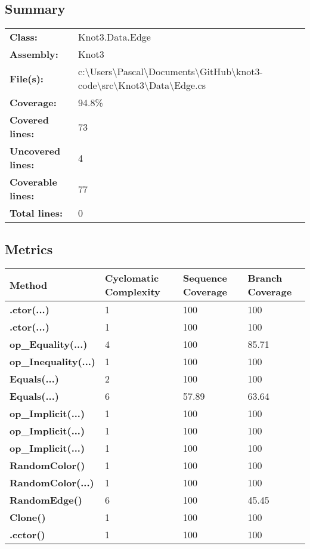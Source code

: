 \documentclass[a4paper,10pt]{article}
\begin{document}
\subsection{Summary}
\begin{longtable}[l]{ll}
\textbf{Class:} & Knot3.Data.Edge\\
\textbf{Assembly:} & Knot3\\
\textbf{File(s):} & \begin{minipage}[t]{12cm}{c:\textbackslash Users\textbackslash Pascal\textbackslash Documents\textbackslash GitHub\textbackslash knot3-code\textbackslash src\textbackslash Knot3\textbackslash Data\textbackslash Edge.cs}\end{minipage} \\
\textbf{Coverage:} & 94.8\%\\
\textbf{Covered lines:} & 73\\
\textbf{Uncovered lines:} & 4\\
\textbf{Coverable lines:} & 77\\
\textbf{Total lines:} & 0\\
\end{longtable}
\subsection{Metrics}
\begin{longtable}[l]{|l|l|l|l|}
\hline
\textbf{Method} & \textbf{Cyclomatic Complexity} & \textbf{Sequence Coverage} & \textbf{Branch Coverage}\\
\hline
\textbf{.ctor(...)} & 1 & 100 & 100\\
\hline
\textbf{.ctor(...)} & 1 & 100 & 100\\
\hline
\textbf{op\_Equality(...)} & 4 & 100 & 85.71\\
\hline
\textbf{op\_Inequality(...)} & 1 & 100 & 100\\
\hline
\textbf{Equals(...)} & 2 & 100 & 100\\
\hline
\textbf{Equals(...)} & 6 & 57.89 & 63.64\\
\hline
\textbf{op\_Implicit(...)} & 1 & 100 & 100\\
\hline
\textbf{op\_Implicit(...)} & 1 & 100 & 100\\
\hline
\textbf{op\_Implicit(...)} & 1 & 100 & 100\\
\hline
\textbf{RandomColor()} & 1 & 100 & 100\\
\hline
\textbf{RandomColor(...)} & 1 & 100 & 100\\
\hline
\textbf{RandomEdge()} & 6 & 100 & 45.45\\
\hline
\textbf{Clone()} & 1 & 100 & 100\\
\hline
\textbf{.cctor()} & 1 & 100 & 100\\
\hline
\end{longtable}
\end{document}
